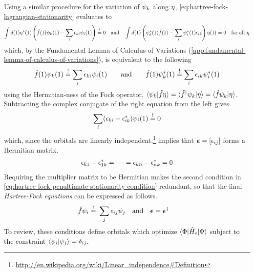 \documentclass[11pt]{article}
\numberwithin{equation}{section}
\begin{document}
Using a similar procedure for the variation of $\psi _k$ along $\eta $, \cref{eq:hartree-fock-lagrangian-stationarity} evaluates to
\begin{align*}
  \int
  d(1)
  \eta^*(1)
  \left(
    \hat{f}(1)\psi _k(1)
  -
    \sum_i
    \epsilon _{ki}
    \psi _i(1)
  \right)
\overset{!}=0
\hspace{10pt}
  \text{and}
\hspace{10pt}
  \int
  d(1)
  \left(
    \psi _k^*(1)
    \hat{f}(1)
  -
    \sum_i
    \psi _i^*(1)
    \epsilon _{ik}
  \right)
  \eta(1)
\overset{!}=0
\hspace{10pt}
  \text{for all $\eta $}
\end{align*}
which, by the Fundamental Lemma of Calculus of Variations (\cref{app:fundamental-lemma-of-calculus-of-variations}), is equivalent to the following
\begin{align}\label{eq:hartree-fock-penultimate-stationarity-condition}
  \hat{f}(1)
  \psi _k(1)
\overset{!}{=}
  \sum_i
  \epsilon _{ki}
  \psi _i(1)
\hspace{20pt}
  \text{and}
\hspace{20pt}
  \hat{f}(1)
  \psi _k^*(1)
\overset{!}{=}
  \sum_i
  \epsilon _{ik}
  \psi _i^*(1)
\end{align}
using the Hermitian-ness of the Fock operator, $\langle\psi _k|\hat{f}\eta\rangle=\langle\hat{f}^\dagger\psi _k|\eta\rangle=\langle\hat{f}\psi _k|\eta\rangle$.
Subtracting the complex conjugate of the right equation from the left gives
\begin{align*}
  \sum_i
  (\epsilon _{ki}-\epsilon _{ik}^*)\psi _i(1)
\overset{!}=
  0
\end{align*}
which, since the orbitals are linearly independent,\footnote{\url{http://en.wikipedia.org/wiki/Linear_independence\#Definition}}
implies that $\bm{\ev}=[\ev_{ij}]$ forms a Hermitian matrix.
\begin{align}
  \epsilon _{k1}-\epsilon _{1k}^*=\cdots=\epsilon _{kn}-\epsilon _{nk}^*=0
\end{align}
Requiring the multiplier matrix to be Hermitian makes the second condition in \cref{eq:hartree-fock-penultimate-stationarity-condition} redundant, so that the final \textit{Hartree-Fock equations} can be expressed as follows.
\begin{align}\label{eq:hartree-fock-noncanonical-stationarity-condition}
  \op{f}\y_i
\overset{!}=&\
  \sum_j
  \ev_{ij}
  \y_j
\hspace{10pt}
  \text{and}
\hspace{10pt}
  \bm{\ev}
\overset{!}=
  \bm{\ev}\dg
\end{align}
To review, these conditions define orbitals which optimize $\langle\Phi |\hat{H}_e|\Phi \rangle$ subject to the constraint $\langle\psi _i|\psi _j\rangle=\delta _{ij}$.
\end{document}
